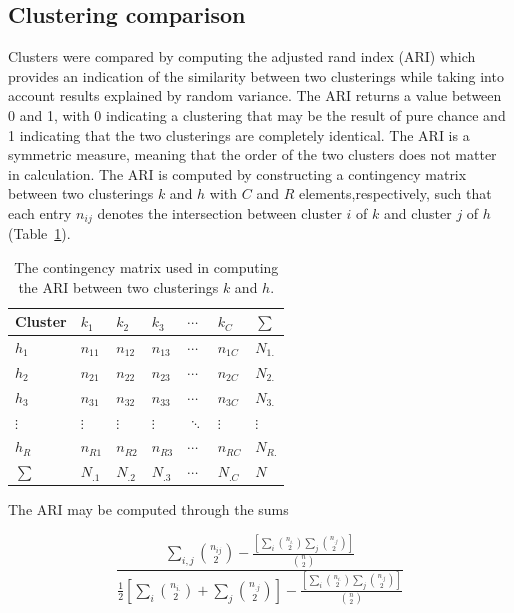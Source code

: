\documentclass[12pt,oneside,onecolumn,a4paper]{article}
\begin{document}
\subsection{Clustering comparison}

Clusters were compared by computing the adjusted rand index (ARI) which provides an indication of the similarity between two clusterings while taking into account results explained by random variance. The ARI returns a value between 0 and 1, with 0 indicating a clustering that may be the result of pure chance and 1 indicating that the two clusterings are completely identical. The ARI is a symmetric measure, meaning that the order of the two clusters does not matter in calculation. The ARI is computed by constructing a contingency matrix between two clusterings $k$ and $h$ with $C$ and $R$ elements,respectively, such that each entry $n_{ij}$ denotes the intersection between cluster $i$ of $k$ and cluster $j$ of $h$ (Table~\ref{table:2}). 

\begin{table}[H]
\begin{center}
\caption{The contingency matrix used in computing the ARI between two clusterings $k$ and $h$. \citep{Zhang2010ARImpAG}}
\begin{tabular}{ l | l l l l l | l } 
Cluster	& $k_1$ & $k_2$ & $k_3$ & $\cdots$ & $k_C$ & $\sum$ \\ 
\hline
$h_1$ & $n_{11}$ & $n_{12}$ & $n_{13}$ & $\cdots$ & $n_{1C}$ & $N_{1.}$\\ 
$h_{2}$ & $n_{21}$ & $n_{22}$ & $n_{23}$ & $\cdots$ & $n_{2C}$ & $N_{2.}$\\ 
$h_{3}$ & $n_{31}$ & $n_{32}$ & $n_{33}$ & $\cdots$ & $n_{3C}$ & $N_{3.}$\\ 
$\vdots$ & $\vdots$ & $\vdots$ & $\vdots$ & $\ddots$ & $\vdots$ & $\vdots$\\ 
$h_{R}$ & $n_{R1}$ & $n_{R2}$ & $n_{R3}$ & $\cdots$ & $n_{RC}$ & $N_{R.}$\\ 
\hline
$\sum$ & $N_{.1}$ & $N_{.2}$ & $N_{.3}$ & $\cdots$ & $N_{.C}$ & $N$\\ 
\end{tabular}
\label{table:2}
\end{center}
\end{table}

\noindent
The ARI may be computed \citep{Yeung2001DetailsOT} through the sums

$$\frac{\sum_{i,j}{{n_{ij}}\choose{2}}-\frac{\left[\sum_{i}{{n_{i.}}\choose{2}}\sum_{j}{{n_{.j}}\choose{2}}\right]}{{n\choose{2}}}}{\frac{1}{2}\left[\sum_{i}{{n_{i.}}\choose{2}}+\sum_{j}{{n_{.j}}\choose{2}}\right]-\frac{\left[\sum_{i}{{n_{i.}}\choose{2}}\sum_{j}{{n_{.j}}\choose{2}}\right]}{{n\choose{2}}}}$$
\end{document}
